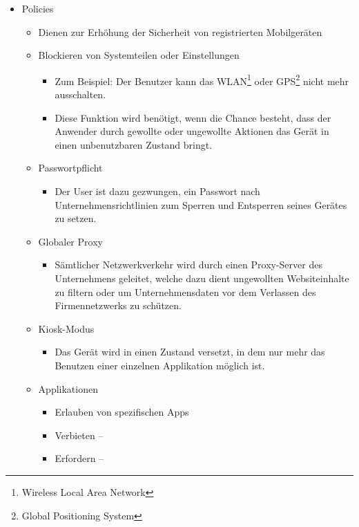 \begin{itemize}
	\item Policies
	\begin{itemize}
		\item Dienen zur Erhöhung der Sicherheit von registrierten Mobilgeräten
		\item Blockieren von Systemteilen oder Einstellungen
		\begin{itemize}
			\item Zum Beispiel: Der Benutzer kann das WLAN\footnote{Wireless Local Area Network} oder GPS\footnote{Global Positioning System} nicht mehr ausschalten.
			\item Diese Funktion wird benötigt, wenn die Chance besteht, dass der Anwender durch gewollte oder ungewollte Aktionen das Gerät in einen unbenutzbaren Zustand bringt.
		\end{itemize}
		\item Passwortpflicht
		\begin{itemize}
			\item Der User ist dazu gezwungen, ein Passwort nach Unternehmensrichtlinien zum Sperren und Entsperren seines Gerätes zu setzen.
		\end{itemize}
		\item Globaler Proxy
		\begin{itemize}
			\item Sämtlicher Netzwerkverkehr wird durch einen Proxy-Server des Unternehmens geleitet, welche dazu dient ungewollten Websiteinhalte zu filtern oder um Unternehmensdaten vor dem Verlassen des Firmennetzwerks zu schützen.
		\end{itemize}
		\item Kiosk-Modus
		\begin{itemize}
			\item Das Gerät wird in einen Zustand versetzt, in dem nur mehr das Benutzen einer einzelnen Applikation möglich ist.
		\end{itemize}
		\item Applikationen
		\begin{itemize}
			\item Erlauben von spezifischen Apps
			\item Verbieten –
			\item Erfordern –
		\end{itemize}
	\end{itemize}
\end{itemize}


